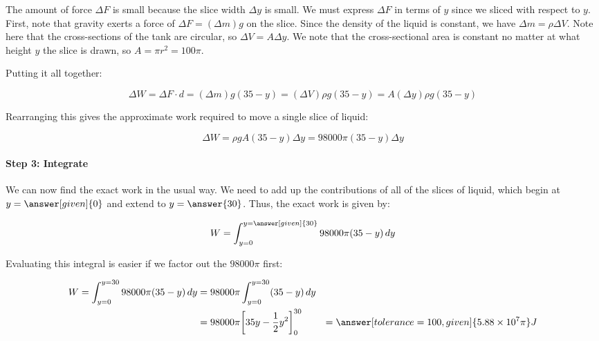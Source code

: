 \documentclass{ximera}
\begin{document}
\begin{example}
\begin{explanation}
The amount of force $\Delta F$ is small because the slice width $\Delta y$ is small.  We must express $\Delta F$ in terms of $y$ since we sliced with respect to $y$.  First, note that gravity exerts a force of $\Delta F = (\Delta m) g $ on the slice.  Since the density of the liquid is constant, we have $\Delta m = \rho \Delta V$.  Note here that the cross-sections of the tank are circular, so $\Delta V = A \Delta y$.  We note that the cross-sectional area is constant no matter at what height $y$ the slice is drawn, so $A = \pi r^2 = 100 \pi$.

Putting it all together:

\[ \Delta W = \Delta F \cdot d = (\Delta m) g (35-y) = (\Delta V) \rho g (35-y) = A (\Delta y) \rho g (35-y) \]

Rearranging this gives the approximate work required to move a single slice of liquid:

\[
\Delta W = \rho g A (35-y) \Delta y = 98000 \pi (35-y) \Delta y
\]

\paragraph{Step 3: Integrate} 

We can now find the exact work in the usual way.  We need to add up the contributions of all of the slices of liquid, which begin at $y=\answer[given]{0}$ and extend to $y=\answer{30}$.  Thus, the exact work is given by:

\[ W = \int_{y=0}^{y= \answer[given]{30}} 98000\pi(35-y) \d y \]

Evaluating this integral is easier if we factor out the $98000\pi$ first:

\begin{align*}
W = \int_{y=0}^{y= 30} 98000\pi(35-y) \d y &= 98000\pi  \int_{y=0}^{y= 30} (35-y) \d y\\
&= 98000\pi \eval{35y-\frac{1}{2}y^2}_0^{30} 
&= \answer[tolerance=100, given]{ 5.88 \times 10^7 \pi} J
\end{align*}
\end{explanation}

\end{example}
%    
\end{document}

